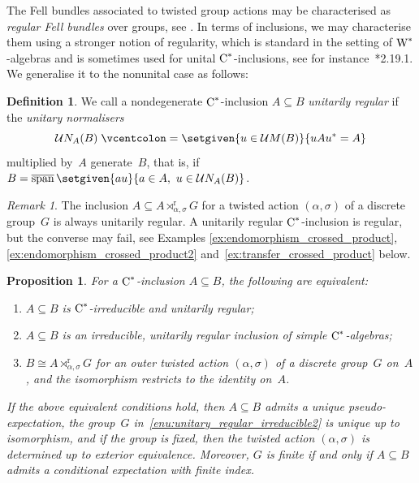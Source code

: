 \documentclass[a4paper]{amsart}
\theoremstyle{plain}
\newtheorem{proposition}[theorem]{Proposition}
\theoremstyle{definition}
\newtheorem{definition}[theorem]{Definition}
\theoremstyle{remark}
\newtheorem{remark}[theorem]{Remark}
\numberwithin{theorem}{section}
\numberwithin{equation}{section}
\DeclareMathOperator*{\clsp}{\overline{span}} %
\newcommand*{\nb}{\nobreakdash}
\newcommand*{\red}{\mathrm{r}}%
\newcommand*{\Cst}{\textup C^*}%
\newcommand*{\Wst}{\textup W^*}%
\newcommand*{\UMult}{\mathcal UM}%
\newcommand*{\defeq}{\mathrel{\vcentcolon=}}%
\begin{document}
The Fell bundles associated to twisted group actions may be
characterised as \emph{regular Fell bundles} over groups,
see \cites{Exel:TwistedPartialActions, BussExel:Regular.Fell.Bundle}.
In terms of inclusions, we may characterise them using a stronger
notion of regularity, which is standard in the setting of
\(\Wst\)\nb-algebras and is sometimes used for unital
\(\Cst\)\nb-inclusions, see for
instance~\cite{Bakshi-Gupta:Regular_inclusions}*{2.19.1}.
We generalise it to the nonunital case as follows:

\begin{definition}
  We call a nondegenerate \(\Cst\)\nb-inclusion \(A\subseteq B\)
  \emph{unitarily regular} if the \emph{unitary normalisers}
  \[
    \mathcal{U}N_A(B)\defeq\setgiven{u\in \UMult(B)}{u A u^*=A}
  \]
  multiplied by~\(A\) generate~\(B\), that is, if \(B=\clsp\setgiven{a
    u}{a\in A,\ u\in \mathcal{U}N_A(B)}\).
\end{definition}

\begin{remark}
  The inclusion \(A\subseteq A\rtimes^\red_{\alpha,\sigma} G\)
  for a twisted action \((\alpha,\sigma)\) of a discrete group~\(G\)
  is always unitarily regular.
  A unitarily regular \(\Cst\)\nb-inclusion is regular, but the
  converse may fail, see Examples \ref{ex:endomorphism_crossed_product},
  \ref{ex:endomorphism_crossed_product2}
  and~\ref{ex:transfer_crossed_product} below.
\end{remark}

\begin{proposition}
  \label{cor:unitary_regular_irreducible}
  For a \(\Cst\)\nb-inclusion \(A\subseteq B\), the following are
  equivalent:
  \begin{enumerate}
  \item \label{enu:unitary_regular_irreducible1}%
    \(A\subseteq B\) is \(\Cst\)\nb-irreducible and unitarily regular;
  \item \label{enu:unitary_regular_irreducible1.5}%
    \(A\subseteq B\) is an  irreducible, unitarily regular inclusion
    of simple \(\Cst\)\nb-algebras;
  \item \label{enu:unitary_regular_irreducible2}%
    \(B\cong A\rtimes^\red_{\alpha,\sigma} G\)  for an outer twisted
    action \((\alpha,\sigma)\) of a discrete group~\(G\) on~\(A\), and
    the isomorphism restricts to the identity on~\(A\).
  \end{enumerate}
  If the above equivalent conditions hold, then \(A\subseteq B\)
  admits a unique pseudo-expectation, the group~\(G\)
  in~\ref{enu:unitary_regular_irreducible2} is unique up to
  isomorphism, and if the group is fixed, then the twisted action
  \((\alpha,\sigma)\) is determined up to exterior equivalence.
  Moreover, \(G\) is finite if and only if \(A\subseteq B\) admits a
  conditional expectation with finite index.
\end{proposition}
\end{document}
